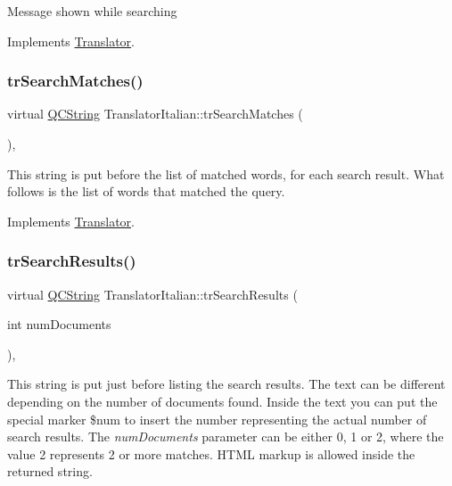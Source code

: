 Message shown while searching 

Implements \mbox{\hyperlink{class_translator}{Translator}}.

\mbox{\label{class_translator_italian_adb2d1bc1a5ebcd81bdf45c6a32830d21}} 
\subsubsection{\texorpdfstring{trSearchMatches()}{trSearchMatches()}}
{\footnotesize\ttfamily virtual \mbox{\hyperlink{class_q_c_string}{Q\+C\+String}} Translator\+Italian\+::tr\+Search\+Matches (\begin{DoxyParamCaption}{ }\end{DoxyParamCaption})\hspace{0.3cm}{\ttfamily [inline]}, {\ttfamily [virtual]}}

This string is put before the list of matched words, for each search result. What follows is the list of words that matched the query. 

Implements \mbox{\hyperlink{class_translator}{Translator}}.

\mbox{\label{class_translator_italian_a0c2b002675a15343c8cf5eb23b644e3a}} 
\subsubsection{\texorpdfstring{trSearchResults()}{trSearchResults()}}
{\footnotesize\ttfamily virtual \mbox{\hyperlink{class_q_c_string}{Q\+C\+String}} Translator\+Italian\+::tr\+Search\+Results (\begin{DoxyParamCaption}\item[{int}]{num\+Documents }\end{DoxyParamCaption})\hspace{0.3cm}{\ttfamily [inline]}, {\ttfamily [virtual]}}

This string is put just before listing the search results. The text can be different depending on the number of documents found. Inside the text you can put the special marker \$num to insert the number representing the actual number of search results. The {\itshape num\+Documents} parameter can be either 0, 1 or 2, where the value 2 represents 2 or more matches. H\+T\+ML markup is allowed inside the returned string. 

